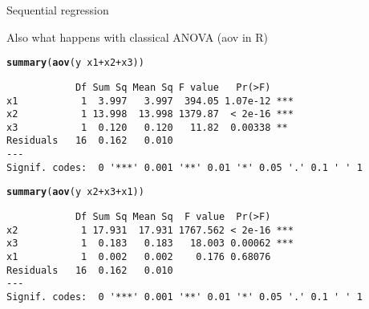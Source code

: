 \documentclass[10pt]{beamer}\usepackage[]{graphicx}\usepackage[]{color}
\makeatletter
\newcommand{\hlopt}[1]{\textcolor[rgb]{0,0,0}{#1}}%
\newcommand{\hlstd}[1]{\textcolor[rgb]{0.345,0.345,0.345}{#1}}%
\newcommand{\hlkwd}[1]{\textcolor[rgb]{0.737,0.353,0.396}{\textbf{#1}}}%
\newenvironment{kframe}{%
 \def\at@end@of@kframe{}%
 \ifinner\ifhmode%
  \def\at@end@of@kframe{\end{minipage}}%
  \begin{minipage}{\columnwidth}%
 \fi\fi%
 \def\FrameCommand##1{\hskip\@totalleftmargin \hskip-\fboxsep
 \colorbox{shadecolor}{##1}\hskip-\fboxsep
     \hskip-\linewidth \hskip-\@totalleftmargin \hskip\columnwidth}%
 \MakeFramed {\advance\hsize-\width
   \@totalleftmargin\z@ \linewidth\hsize
   \@setminipage}}%
 {\par\unskip\endMakeFramed%
 \at@end@of@kframe}
\newenvironment{knitrout}{}{} %
\makeatother
\begin{document}
\begin{frame}[fragile]{Sequential regression}

  Also what happens with classical ANOVA (aov in R)
  
\begin{knitrout}\small
{}\color{fgcolor}\begin{kframe}
\begin{alltt}
  \hlkwd{summary}\hlstd{(}\hlkwd{aov}\hlstd{(y} \hlopt{~} \hlstd{x1} \hlopt{+} \hlstd{x2} \hlopt{+} \hlstd{x3))}
\end{alltt}
\begin{verbatim}
            Df Sum Sq Mean Sq F value   Pr(>F)    
x1           1  3.997   3.997  394.05 1.07e-12 ***
x2           1 13.998  13.998 1379.87  < 2e-16 ***
x3           1  0.120   0.120   11.82  0.00338 ** 
Residuals   16  0.162   0.010                     
---
Signif. codes:  0 '***' 0.001 '**' 0.01 '*' 0.05 '.' 0.1 ' ' 1
\end{verbatim}
\begin{alltt}
  \hlkwd{summary}\hlstd{(}\hlkwd{aov}\hlstd{(y} \hlopt{~} \hlstd{x2} \hlopt{+} \hlstd{x3} \hlopt{+} \hlstd{x1))}
\end{alltt}
\begin{verbatim}
            Df Sum Sq Mean Sq  F value  Pr(>F)    
x2           1 17.931  17.931 1767.562 < 2e-16 ***
x3           1  0.183   0.183   18.003 0.00062 ***
x1           1  0.002   0.002    0.176 0.68076    
Residuals   16  0.162   0.010                     
---
Signif. codes:  0 '***' 0.001 '**' 0.01 '*' 0.05 '.' 0.1 ' ' 1
\end{verbatim}
\end{kframe}
\end{knitrout}
\end{frame}
\end{document}
